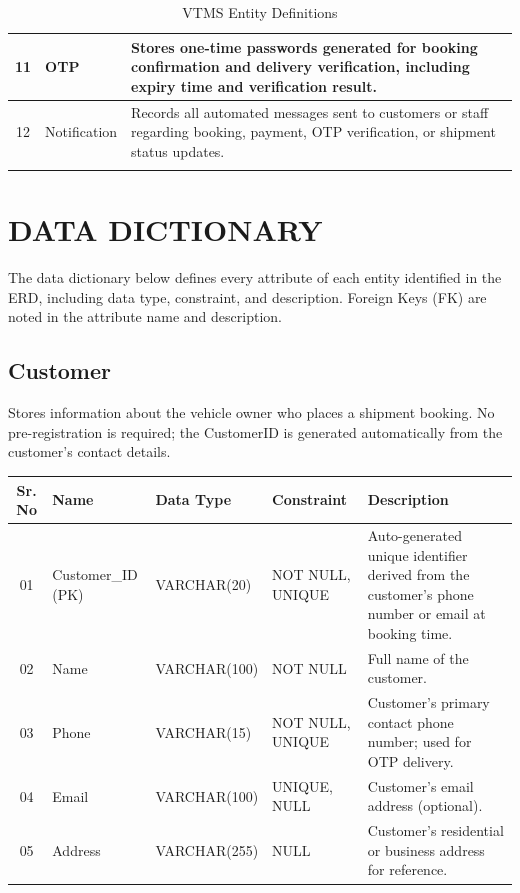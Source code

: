 \documentclass[12pt,a4paper]{report}
\begin{document}
\begin{longtable}{|c|p{4cm}|p{9cm}|}
11 & OTP & Stores one-time passwords generated for booking confirmation and delivery verification, including expiry time and verification result. \\
\hline

12 & Notification & Records all automated messages sent to customers or staff regarding booking, payment, OTP verification, or shipment status updates. \\
\hline

\caption{VTMS Entity Definitions}

\end{longtable}

\section{DATA DICTIONARY}

The data dictionary below defines every attribute of each entity identified in the ERD, including data type, constraint, and description. Foreign Keys (FK) are noted in the attribute name and description.


\subsection{Customer}

Stores information about the vehicle owner who places a shipment booking. No pre-registration is required; the CustomerID is generated automatically from the customer's contact details.

\begin{longtable}{|c|p{3.5cm}|p{2.5cm}|p{3.5cm}|p{5cm}|}
\hline
\textbf{Sr. No} & \textbf{Name} & \textbf{Data Type} & \textbf{Constraint} & \textbf{Description} \\
\hline
01 & Customer\_ID (PK) & VARCHAR(20) & NOT NULL, UNIQUE & Auto-generated unique identifier derived from the customer's phone number or email at booking time. \\
\hline
02 & Name & VARCHAR(100) & NOT NULL & Full name of the customer. \\
\hline
03 & Phone & VARCHAR(15) & NOT NULL, UNIQUE & Customer's primary contact phone number; used for OTP delivery. \\
\hline
04 & Email & VARCHAR(100) & UNIQUE, NULL & Customer's email address (optional). \\
\hline
05 & Address & VARCHAR(255) & NULL & Customer's residential or business address for reference. \\
\hline
\end{longtable}
\end{document}
